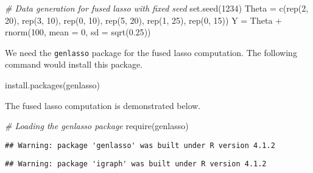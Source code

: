 \documentclass[
]{book}
\newenvironment{Shaded}{\begin{snugshade}}{\end{snugshade}}
\newcommand{\AttributeTok}[1]{\textcolor[rgb]{0.77,0.63,0.00}{#1}}
\newcommand{\CommentTok}[1]{\textcolor[rgb]{0.56,0.35,0.01}{\textit{#1}}}
\newcommand{\DecValTok}[1]{\textcolor[rgb]{0.00,0.00,0.81}{#1}}
\newcommand{\FloatTok}[1]{\textcolor[rgb]{0.00,0.00,0.81}{#1}}
\newcommand{\FunctionTok}[1]{\textcolor[rgb]{0.00,0.00,0.00}{#1}}
\newcommand{\NormalTok}[1]{#1}
\newcommand{\OtherTok}[1]{\textcolor[rgb]{0.56,0.35,0.01}{#1}}
\newcommand{\SpecialCharTok}[1]{\textcolor[rgb]{0.00,0.00,0.00}{#1}}
\newcommand{\StringTok}[1]{\textcolor[rgb]{0.31,0.60,0.02}{#1}}
\begin{document}
\begin{Shaded}
\begin{Highlighting}[]
\CommentTok{\# Data generation for fused lasso with fixed seed}
\FunctionTok{set.seed}\NormalTok{(}\DecValTok{1234}\NormalTok{)}
\NormalTok{Theta }\OtherTok{=} \FunctionTok{c}\NormalTok{(}\FunctionTok{rep}\NormalTok{(}\DecValTok{2}\NormalTok{, }\DecValTok{20}\NormalTok{), }\FunctionTok{rep}\NormalTok{(}\DecValTok{3}\NormalTok{, }\DecValTok{10}\NormalTok{), }\FunctionTok{rep}\NormalTok{(}\DecValTok{0}\NormalTok{, }\DecValTok{10}\NormalTok{), }\FunctionTok{rep}\NormalTok{(}\DecValTok{5}\NormalTok{, }\DecValTok{20}\NormalTok{),}
          \FunctionTok{rep}\NormalTok{(}\DecValTok{1}\NormalTok{, }\DecValTok{25}\NormalTok{), }\FunctionTok{rep}\NormalTok{(}\DecValTok{0}\NormalTok{, }\DecValTok{15}\NormalTok{))}
\NormalTok{Y }\OtherTok{=}\NormalTok{ Theta }\SpecialCharTok{+} \FunctionTok{rnorm}\NormalTok{(}\DecValTok{100}\NormalTok{, }\AttributeTok{mean =} \DecValTok{0}\NormalTok{, }\AttributeTok{sd =} \FunctionTok{sqrt}\NormalTok{(}\FloatTok{0.25}\NormalTok{))}
\end{Highlighting}
\end{Shaded}

We need the \texttt{genlasso} package \citep{R-genlasso} for the fused lasso computation. The following command would install this package.

\begin{Shaded}
\begin{Highlighting}[]
\FunctionTok{install.packages}\NormalTok{(}\StringTok{\textquotesingle{}genlasso\textquotesingle{}}\NormalTok{)}
\end{Highlighting}
\end{Shaded}

The fused lasso computation is demonstrated below.

\begin{Shaded}
\begin{Highlighting}[]
\CommentTok{\# Loading the \textquotesingle{}genlasso\textquotesingle{} package}
\FunctionTok{require}\NormalTok{(genlasso)}
\end{Highlighting}
\end{Shaded}

\begin{verbatim}
## Warning: package 'genlasso' was built under R version 4.1.2
\end{verbatim}

\begin{verbatim}
## Warning: package 'igraph' was built under R version 4.1.2
\end{verbatim}
\end{document}
